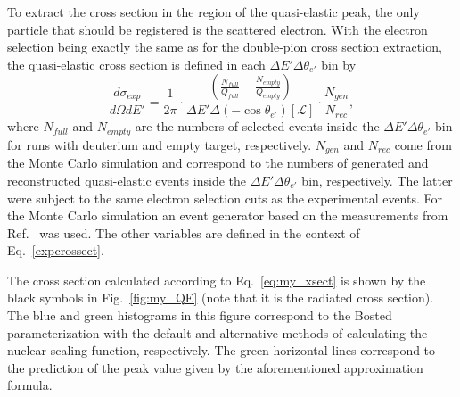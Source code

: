 To extract the cross section in the region of the quasi-elastic peak, the only particle that should be registered is the scattered electron. With the electron selection being exactly the same as for the double-pion cross section extraction, the quasi-elastic cross section is defined in each $\Delta E' \Delta \theta_{e'}$ bin by \vspace{-1em}
\begin{equation}
\frac{d\sigma_{exp}}{d\Omega dE'} = \frac{1}{2\pi} \cdot \frac{\left (\frac{N_{full}}{Q_{full}} - \frac{N_{empty}}{Q_{empty}} \right )}{\Delta E' \Delta(-\cos\theta_{e'}) [\mathcal{L}]} \cdot \frac{N_{gen}}{N_{rec}},\label{eq:my_xsect}
\end{equation}
where $N_{full}$ and $N_{empty}$ are the numbers of selected events inside the $\Delta E' \Delta \theta_{e'}$ bin for runs with deuterium and empty target, respectively. $N_{gen}$ and $N_{rec}$ come from the Monte Carlo simulation and correspond to the numbers of generated and reconstructed quasi-elastic events inside the $\Delta E' \Delta \theta_{e'}$ bin, respectively. The latter were subject to the same electron selection cuts as the experimental events. For the Monte Carlo simulation an event generator based on the measurements from Ref.~\cite{Osipenko:2005gt} was used. The other variables are defined in the context of Eq.~\eqref{expcrossect}.


The cross section calculated according to Eq.~\eqref{eq:my_xsect} is shown by the black symbols in Fig.~\ref{fig:my_QE} (note that it is the radiated cross section). The blue and green histograms in this figure correspond to the Bosted parameterization with the default and alternative methods of calculating the nuclear scaling function, respectively. The green horizontal lines correspond to the prediction of the peak value given by the aforementioned approximation formula.  




\afterpage{\clearpage}

